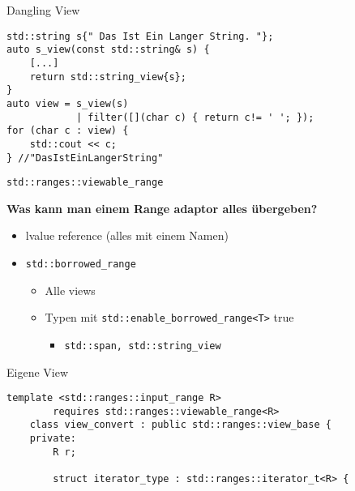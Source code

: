 \begin{frame}[fragile]{Dangling View}
    \begin{verbatim}
std::string s{" Das Ist Ein Langer String. "};
auto s_view(const std::string& s) {
    [...]
    return std::string_view{s};
}
auto view = s_view(s)
            | filter([](char c) { return c!= ' '; });
for (char c : view) {
    std::cout << c;
} //"DasIstEinLangerString"
    \end{verbatim}
\end{frame}

\begin{frame}{\texttt{std::ranges::viewable_range}}
    \begin{center}
        \textbf{Was kann man einem Range adaptor alles übergeben?}
    \end{center}

    \vspace{2.5em}


    \begin{itemize}
        \item<3-> lvalue reference (alles mit einem Namen)
        \item<4-> \texttt{std::borrowed_range}
            \begin{itemize}
                \item<5-> Alle views
                \item<6-> Typen mit \texttt{std::enable_borrowed_range<T>} true
                    \begin{itemize}
                        \item<7-> \texttt{std::span, std::string_view}
                    \end{itemize}
            \end{itemize}
    \end{itemize}
\end{frame}

\begin{frame}[fragile]{Eigene View}
    \begin{verbatim}
template <std::ranges::input_range R>
        requires std::ranges::viewable_range<R>
    class view_convert : public std::ranges::view_base {
    private:
        R r;
    
        struct iterator_type : std::ranges::iterator_t<R> {
    \end{verbatim}
\end{frame}

